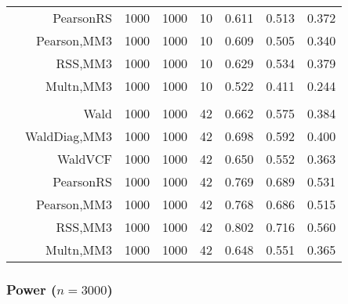 \documentclass[
]{article}
\begin{document}
\begin{table}[H]
{\begin{tabular}[t]{lrrrrrrr}
\hspace{1em} & PearsonRS & 1000 & 1000 & 10 & 0.611 & 0.513 & 0.372\\

\hspace{1em} & Pearson,MM3 & 1000 & 1000 & 10 & 0.609 & 0.505 & 0.340\\

\hspace{1em} & RSS,MM3 & 1000 & 1000 & 10 & 0.629 & 0.534 & 0.379\\

\hspace{1em} & Multn,MM3 & 1000 & 1000 & 10 & 0.522 & 0.411 & 0.244\\
\cmidrule{1-8}
\addlinespace[0.3em]
\multicolumn{8}{l}{\textbf{3F 15V}}\\
\hspace{1em} & Wald & 1000 & 1000 & 42 & 0.662 & 0.575 & 0.384\\

\hspace{1em} & WaldDiag,MM3 & 1000 & 1000 & 42 & 0.698 & 0.592 & 0.400\\

\hspace{1em} & WaldVCF & 1000 & 1000 & 42 & 0.650 & 0.552 & 0.363\\

\hspace{1em} & PearsonRS & 1000 & 1000 & 42 & 0.769 & 0.689 & 0.531\\

\hspace{1em} & Pearson,MM3 & 1000 & 1000 & 42 & 0.768 & 0.686 & 0.515\\

\hspace{1em} & RSS,MM3 & 1000 & 1000 & 42 & 0.802 & 0.716 & 0.560\\

\hspace{1em} & Multn,MM3 & 1000 & 1000 & 42 & 0.648 & 0.551 & 0.365\\
\bottomrule
\end{tabular}}
\endgroup{}
\end{table}

\hypertarget{power-n3000}{%
\subsubsection{\texorpdfstring{Power
(\(n=3000\))}{Power (n=3000)}}\label{power-n3000}}
\end{document}
